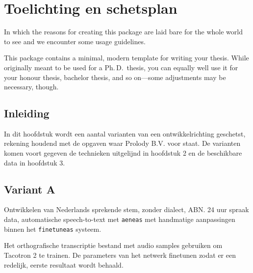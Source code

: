 \chapter{Toelichting en schetsplan}

\begin{center}
  \begin{minipage}{0.5\textwidth}
    \begin{small}
      In which the reasons for creating this package are laid bare for the
      whole world to see and we encounter some usage guidelines.
    \end{small}
  \end{minipage}
  \vspace{0.5cm}
\end{center}

\noindent This package contains a minimal, modern template for writing your
thesis. While originally meant to be used for a Ph.\,D.\ thesis, you can
equally well use it for your honour thesis, bachelor thesis, and so
on---some adjustments may be necessary, though.

\section{Inleiding}
In dit hoofdstuk wordt een aantal varianten van een ontwikkelrichting geschetst, rekening houdend met de opgaven waar Prolody B.V. voor staat. De varianten komen voort gegeven de technieken uitgelijnd in hoofdstuk 2 en de beschikbare data in hoofdstuk 3.

\section{Variant A}
Ontwikkelen van Nederlands sprekende stem, zonder dialect, ABN. 24 uur spraak data, automatische speech-to-text met \texttt{aeneas} met handmatige aanpassingen binnen het \texttt{finetuneas} systeem.

Het orthografische transcriptie bestand met audio samples gebruiken om Tacotron 2 te trainen. De parameters van het netwerk finetunen zodat er een redelijk, eerste resultaat wordt behaald.

